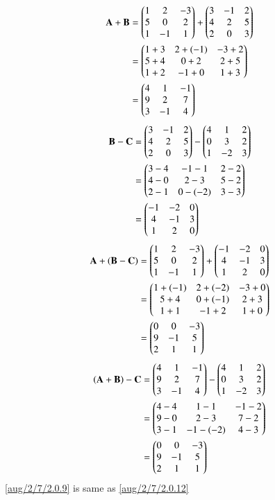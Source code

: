 \begin{align}
    \mathbf{A+B}&=\begin{pmatrix}1&2&-3\\5&0&2\\1&-1&1\end{pmatrix}+\begin{pmatrix}3&-1&2\\4&2&5\\2&0&3\end{pmatrix}\\
    &=\begin{pmatrix}1+3&2+(-1)&-3+2\\5+4&0+2&2+5\\1+2&-1+0&1+3\end{pmatrix}\\
    &=\begin{pmatrix}4&1&-1\\9&2&7\\3&-1&4\end{pmatrix}
 \end{align}
 \begin{align}
     \mathbf{B-C}&=\begin{pmatrix}3&-1&2\\4&2&5\\2&0&3\end{pmatrix}-\begin{pmatrix}4&1&2\\0&3&2\\1&-2&3\end{pmatrix}\\
     &=\begin{pmatrix}3-4&-1-1&2-2\\4-0&2-3&5-2\\2-1&0-(-2)&3-3\end{pmatrix}\\
     &=\begin{pmatrix}-1&-2&0\\4&-1&3\\1&2&0\end{pmatrix}
 \end{align}
 \begin{align}
     \mathbf{A}+\left(\mathbf{B-C}\right)&=\begin{pmatrix}1&2&-3\\5&0&2\\1&-1&1\end{pmatrix}+\begin{pmatrix}-1&-2&0\\4&-1&3\\1&2&0\end{pmatrix}\\
     &=\begin{pmatrix}1+(-1)&2+(-2)&-3+0\\5+4&0+(-1)&2+3\\1+1&-1+2&1+0\end{pmatrix}\\
     &=\begin{pmatrix}0&0&-3\\9&-1&5\\2&1&1\end{pmatrix}\label{aug/2/7/2.0.9}
 \end{align}
 \begin{align}
     \left(\mathbf{A+B}\right)-\mathbf{C}&=\begin{pmatrix}4&1&-1\\9&2&7\\3&-1&4\end{pmatrix}-\begin{pmatrix}4&1&2\\0&3&2\\1&-2&3\end{pmatrix}\\
     &=\begin{pmatrix}4-4&1-1&-1-2\\9-0&2-3&7-2\\3-1&-1-(-2)&4-3\end{pmatrix}\\
     &=\begin{pmatrix}0&0&-3\\9&-1&5\\2&1&1\end{pmatrix}\label{aug/2/7/2.0.12}
 \end{align}
 \eqref{aug/2/7/2.0.9} is same as \eqref{aug/2/7/2.0.12}
 